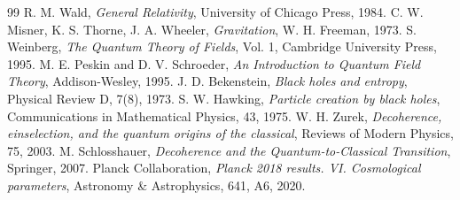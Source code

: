 \documentclass[12pt,a4paper]{article}
\begin{document}
\begin{thebibliography}{99}
 R. M. Wald, \textit{General Relativity}, University of Chicago Press, 1984.
 C. W. Misner, K. S. Thorne, J. A. Wheeler, \textit{Gravitation}, W. H. Freeman, 1973.
 S. Weinberg, \textit{The Quantum Theory of Fields}, Vol. 1, Cambridge University Press, 1995.
 M. E. Peskin and D. V. Schroeder, \textit{An Introduction to Quantum Field Theory}, Addison-Wesley, 1995.
 J. D. Bekenstein, \textit{Black holes and entropy}, Physical Review D, 7(8), 1973.
 S. W. Hawking, \textit{Particle creation by black holes}, Communications in Mathematical Physics, 43, 1975.
 W. H. Zurek, \textit{Decoherence, einselection, and the quantum origins of the classical}, Reviews of Modern Physics, 75, 2003.
 M. Schlosshauer, \textit{Decoherence and the Quantum-to-Classical Transition}, Springer, 2007.
 Planck Collaboration, \textit{Planck 2018 results. VI. Cosmological parameters}, Astronomy \& Astrophysics, 641, A6, 2020.
\end{thebibliography}
\end{document}
